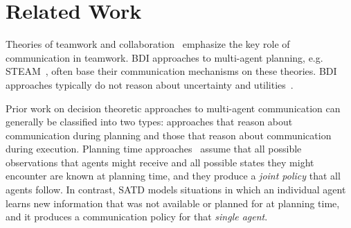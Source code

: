 \section{Related Work}
\label{sec:related}
Theories of teamwork and collaboration~\cite{grosz1996collaborative,cohen1990intention,sonenberg1992planned} emphasize the key role of communication in teamwork. BDI approaches to multi-agent planning, e.g. STEAM~\cite{tambe1997agent}, often base their communication mechanisms on these theories. BDI approaches typically do not reason about uncertainty and utilities~\cite{pynadath2002communicative}. 


Prior work on decision theoretic approaches to multi-agent communication can generally be classified into two types: approaches that reason about communication during planning and those that reason about communication during execution.  
 Planning time approaches~\cite{goldman2003optimizing,pynadath2002communicative,spaan2006decentralized} assume that all possible observations that agents might receive and all possible states they might encounter are known at planning time, and they produce a \emph{joint policy} that all agents follow. In contrast, SATD models situations in which an individual agent learns new information that was not available or planned for at planning time, and it produces a communication policy for that \emph{single agent}. 



